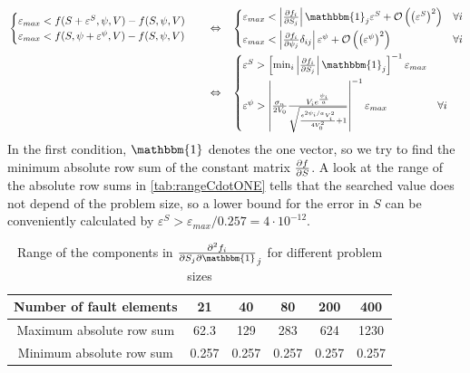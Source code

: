 \begin{align}
&\begin{cases}
	\varepsilon_{max} < f(S+\varepsilon^{S},\psi,V) - f(S,\psi,V) \\
	\varepsilon_{max} < f(S,\psi+\varepsilon^{\psi},V) - f(S,\psi,V) 
\end{cases} &&
\Leftrightarrow&
&\begin{cases}
		\varepsilon_{max} < \left|\pdv{f_i}{S_j}\right|\mathbbm{1}_j \varepsilon^S + \mathcal{O}\left(\left(\varepsilon^S\right)^2\right) & \forall i \\[0.2cm]
		\varepsilon_{max} < \left|\pdv{f_i}{\psi_j}\delta_{ij}\right|\varepsilon^\psi + \mathcal{O}\left(\left(\varepsilon^\psi\right)^2\right) & \forall i 
\end{cases} \\
&&&\Leftrightarrow &
&\begin{cases}
	\varepsilon^S > \left[\min_i\left|\pdv{f_i}{S_j}\right|\mathbbm{1}_j\right]^{-1}\varepsilon_{max}  \\[0.2cm]
	\varepsilon^\psi > \left|\frac{\sigma_n}{2V_0}\frac{V_i e^{\frac{\psi_i}{a}}}{\sqrt{\frac{e^{2\psi_i/a}V_i^2}{4V_0^2} + 1}} \right|^{-1}\varepsilon_{max} & \forall i
\end{cases}
\end{align}
In the first condition, $\mathbbm{1}$ denotes the one vector, so we try to find the minimum absolute row sum of the constant matrix $\pdv{f}{S}$. A look at the range of the absolute row sums in \autoref{tab:rangeCdotONE} tells that the searched value does not depend of the problem size, so a lower bound for the error in $S$ can be conveniently calculated by $\varepsilon^S > \varepsilon_{max}/0.257=4\cdot10^{-12}$.
\begin{table}[H]
	\centering 
	\begin{tabular}{ | c | c c c c c |}
		\hline	
		Number of fault elements	& 21 	& 40 	& 80 	& 200 	& 400 	\\ \hline
		Maximum absolute row sum    & 62.3	& 129	& 283	& 624 	& 1230	\\  
		Minimum absolute row sum  	& 0.257	& 0.257 & 0.257	& 0.257 & 0.257 \\
		\hline
	\end{tabular}
	\caption{Range of the components in $\pdv{f_i}{S_j}\mathbbm{1}_j$ for different problem sizes} 
	\label{tab:rangeCdotONE}
\end{table}


